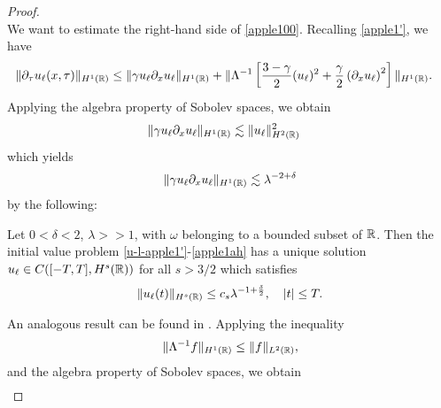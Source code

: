 \begin{proof}
\begin{equation}
\end{equation}
%
%
We want to estimate the right-hand side of \eqref{apple100}. Recalling
\eqref{apple1'}, we have
%
%
\begin{equation}
\label{apple101}
\begin{split}
\|\partial_\tau u_\ell(x,\tau) \|_{H^1(\mathbb{R})}
& \le \|\gamma u_\ell \partial_x u_\ell \|_{H^1(\mathbb{R})}
+ \|\Lambda^{-1} \left[
\frac{3-\gamma}{2} (u_\ell)^2 + \frac{\gamma}{2} \left( \partial_x u_\ell 
\right)^2
\right] \|_{H^1(\mathbb{R})}.
\end{split}
\end{equation}
%
%
Applying the algebra property of Sobolev spaces, we obtain
%
%
\begin{equation*}
\begin{split}
\|\gamma u_\ell \partial_x u_\ell \|_{H^1(\mathbb{R})} &
\lesssim \|u_\ell\|_{H^2(\mathbb{R})}^2
\end{split}
\end{equation*}
%
%
which yields 
%
%
\begin{equation}
\begin{split}
\|\gamma u_\ell \partial_x u_\ell \|_{H^1(\mathbb{R})} \lesssim \lambda^{-2 + \delta}
\label{apple102}
\end{split}
\end{equation}
%
%
%
%
by the following:
%
%
%
%
%
% 				
%
%
%
%
%
\begin{lemma}
\label{appleb}
Let $0<\delta<2$, $\lambda >>1$, with $\omega$ belonging to a bounded
subset of $\mathbb{R}$. Then the initial value problem
\eqref{u-l-apple1'}-\eqref{apple1ah}
has a unique solution
$u_\ell \in C( [-T,T], H^s(\mathbb{R}))$ for all $s
> 3/2$ which satisfies
%
%
\begin{equation}
\label{apple10'}
\|u_\ell(t)\|_{H^s(\mathbb{R})} \le c_s \lambda^{-1 +
\frac{\delta}{2}}, \quad |t| \le T.
\end{equation}
%
%
\end{lemma}
%
An analogous result can be found in \cite{Himonas:2009fk}. 
%
%
%
Applying the inequality 
%
\begin{equation*}
\begin{split}
\|\Lambda^{-1} f \|_{H^1(\mathbb{R})} \le \|f\|_{L^2(\mathbb{R})},
\label{apple27}
\end{split}
\end{equation*}
%
%
and the algebra property of Sobolev spaces, we obtain
%
%
\begin{equation*}
\begin{split}

\end{split}
\end{equation*}
\end{proof}
